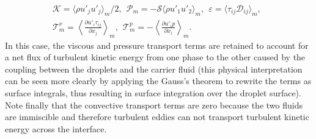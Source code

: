 \begin{equation}%
  \begin{aligned}
\mathcal{K} = \langle \rho u'_j u'_j \rangle_m/2, \ \
\mathcal{P}_m = -\mathcal{S} \langle \rho u'_1 u'_2 \rangle_m, \ \
\varepsilon = \langle \tau_{ij} \mathcal{D}_{ij} \rangle_m, \ \ \\
\mathcal{T}^\nu_m = \left< \frac{\partial u'_i \tau_{ij}}{\partial x_j} \right>_m,  \ \
\mathcal{T}^p_m = - \left< \frac{\partial  u'_i p}{\partial x_i} \right>_m.
\end{aligned}
\end{equation}
In this case, the viscous and pressure transport terms are retained to account for a net flux of turbulent kinetic energy from one phase to the other caused by the coupling between the droplets and the carrier fluid (this physical interpretation can be seen more clearly by applying the Gauss's theorem to rewrite the terms as surface integrals, thus resulting in surface integration over the droplet surface). Note finally that the convective transport terms are zero because the two fluids are immiscible and therefore turbulent eddies can not transport turbulent kinetic energy across the interface.

